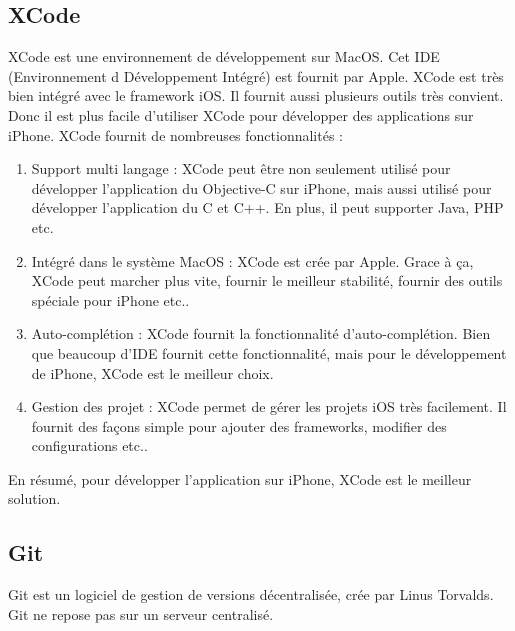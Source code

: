 \subsection{XCode} %
\label{ssub:xcode}

XCode est une environnement de développement sur MacOS. Cet IDE (Environnement d Développement Intégré) est fournit par Apple. XCode est très bien intégré avec le framework iOS. Il fournit aussi plusieurs outils très convient. Donc il est plus facile d'utiliser XCode pour développer des applications sur iPhone. XCode fournit de nombreuses fonctionnalités : 
\begin{enumerate}
	\item Support multi langage : XCode peut être non seulement utilisé pour développer l'application du Objective-C sur iPhone, mais aussi utilisé pour développer l'application du C et C++. En plus, il peut supporter Java, PHP etc. 
	\item Intégré dans le système MacOS : XCode est crée par Apple. Grace à ça, XCode peut marcher plus vite, fournir le meilleur stabilité, fournir des outils spéciale pour iPhone etc..
	\item Auto-complétion : XCode fournit la fonctionnalité d'auto-complétion. Bien que beaucoup d'IDE fournit cette fonctionnalité, mais pour le développement de iPhone, XCode est le meilleur choix. 
	\item Gestion des projet : XCode permet de gérer les projets iOS très facilement. Il fournit des façons simple pour ajouter des frameworks, modifier des configurations etc.. 
\end{enumerate}
En résumé, pour développer l'application sur iPhone, XCode est le meilleur solution.

\subsection{Git} %
\label{sub:github}

Git est un logiciel de gestion de versions décentralisée, crée par Linus Torvalds. Git ne repose pas sur un serveur centralisé. 





